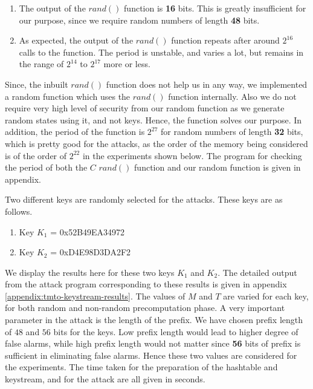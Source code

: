 \begin{enumerate}
\item The output of the $rand()$ function is \textbf{16} bits. This is greatly insufficient for our purpose, since we require random numbers of length \textbf{48} bits. 
\item As expected, the output of the $rand()$ function repeats after around $2^{16}$ calls to the function. The period is unstable, and varies a lot, but remains in the range of $2^{14}$ to $2^{17}$ more or less.
\end{enumerate}

Since, the inbuilt $rand()$ function does not help us in any way, we implemented a random function which uses the $rand()$ function internally. Also we do not require very high level of security from our random function as we generate random states using it, and not keys. Hence, the function solves our purpose. In addition, the period of the function is $2^{27}$ for random numbers of length \textbf{32} bits, which is pretty good for the attacks, as the order of the memory being considered is of the order of $2^{22}$ in the experiments shown below. The program for checking the period of both the $C$ $rand()$ function and our random function is given in appendix.

Two different keys are randomly selected for the attacks. These keys are as follows.

\begin{enumerate}
\item Key $K_1$ = 0x52B49EA34972
\item Key $K_2$ = 0xD4E98D3DA2F2
\end{enumerate}

We display the results here for these two keys $K_1$ and $K_2$. The detailed output from the attack program corresponding to these results is given in appendix \ref{appendix:tmto-keystream-results}. The values of $M$ and $T$ are varied for each key, for both random and non-random precomputation phase. A very important parameter in the attack is the length of the prefix. We have chosen prefix length of $48$ and $56$ bits for the keys. Low prefix length would lead to higher degree of false alarms, while high prefix length would not matter since \textbf{56} bits of prefix is sufficient in eliminating false alarms. Hence these two values are considered for the experiments. The time taken for the preparation of the hashtable and keystream, and for the attack are all given in seconds. 

